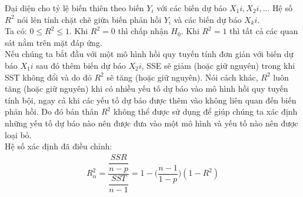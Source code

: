 \documentclass[a4paper]{article}
\newcommand{\gachdau}{\hspace*{1.5em}\ignorespaces}
\begin{document}
            \hspace{1pt}
            Đại diện cho tỷ lệ biến thiên theo biến $Y_i$ với các biến dự báo $X_1i, X_2i, . . .$ Hệ số $R^2$ nói lên tính chặt chẽ giữa biến phản hồi $Y_i$ và các biến dự báo $X_ki$.\\
            \gachdau
            Ta có: $0 \leq R^2 \leq 1.$ Khi $R^2 = 0$ thì chấp nhận $H_0$. Khi $R^2 = 1$ thì tất cả các quan sát nằm trên mặt đáp ứng.\\
            \gachdau
            Nếu chúng ta bắt đầu với một mô hình hồi quy tuyến tính đơn giản với biến dự báo $X_1i$ sau đó thêm biến dự báo $X_2i$, SSE sẽ giảm (hoặc giữ nguyên) trong khi SST không đổi và do đó $R^2$ sẽ tăng (hoặc giữ nguyên). Nói cách khác, $R^2$ luôn tăng (hoặc giữ nguyên) khi có nhiều yếu tố dự báo vào mô hình hồi quy tuyến tính bội, ngay cả khi các yếu tố dự báo được thêm vào không liên quan đến biến phản hồi. Do đó bản thân $R^2$ không thể được sử dụng để giúp chúng ta xác định những yếu tố dự báo nào nên được đưa vào một mô hình và yếu tố nào nên được loại bỏ.\\
            \gachdau
            Hệ số xác định đã điều chỉnh:
            \vspace{-10pt}
            \begin{align*}
                R_\alpha^2 = \dfrac{\dfrac{SSR}{n-p}}{\dfrac{SST}{n-1}} = 1 - \big(\dfrac{n-1}{1-p})(1-R^2)
            \end{align*}


    
\end{document}
